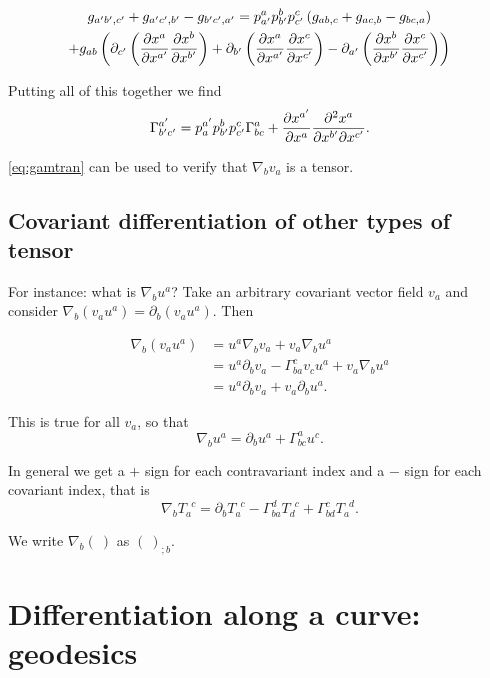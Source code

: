 \documentclass{notes}
\newcommand{\del}{\nabla}
\begin{document}
\begin{multline*}
g_{a'b',c'} + g_{a' c',b'} - g_{b' c',a'} =p^a_{a'} p^b_{b'} p^c_{c'}
\left( g_{ab,c} + g_{ac,b} - g_{bc,a} \right) \\
+ g_{ab}
\left( \partial_{c'} \left( \frac{\partial x^a}{\partial x^{a'}} \frac{\partial x^b}{\partial x^{b'}}\right)
+ \partial_{b'} \left(\frac{\partial x^a}{\partial x^{a'}} \frac{\partial x^c}{\partial x^{c'}} \right)
- \partial_{a'} \left( \frac{\partial x^b}{\partial x^{b'}} \frac{\partial x^c}{\partial x^{c'}}\right) \right) 
\end{multline*}

Putting all of this together we find 
\begin{equation}\label{eq:gamtran}
\Gamma^{a'}_{b' c'} = p^{a'}_a p^b_{b'} p^c_{c'} \Gamma^a_{bc}
+ \frac{\partial x^{a'}}{\partial x^a} \frac{\partial ^2 x^a}{\partial x^{b'} \partial x^{c'}}.
\end{equation}

\eqref{eq:gamtran} can be used to verify that $\del_b v_a$ is a
tensor.

\subsection{Covariant differentiation of other types of tensor}

For instance:  what is $\del_b u^a$?  Take an arbitrary covariant
vector field $v_a$ and consider $\del_b \left(v_a u^a\right)
= \partial_b \left( v_a u^a \right)$.  Then

\begin{align*}
\del_b \left( v_a u^a \right) &= u^a \del_b v_a + v_a \del_b u^a \\
&= u^a \partial_b v_a - \Gamma^c_{ba} v_c u^a + v_a \del_b u^a \\
&= u^a \partial_b v_a + v_a \partial_b u^a.
\end{align*}

This is true for all $v_a$, so that
\[
\del_b u^a = \partial_b u^a + \Gamma^a_{bc} u^c.
\]

In general we get a $+$ sign for each contravariant index and a $-$
sign for each covariant index, that is
\[
\del_b T_a^{\phantom{a} c} = \partial_b T_a^{\phantom{a}c}
- \Gamma^d_{ba} T_d^{\phantom{d} c} + \Gamma^c_{bd} T_a^{\phantom{a} d}.
\]

We write $\del_b\left(\ \right)$ as $\left(\ \right)_{;b}$.

\section{Differentiation along a curve: geodesics}
\end{document}
